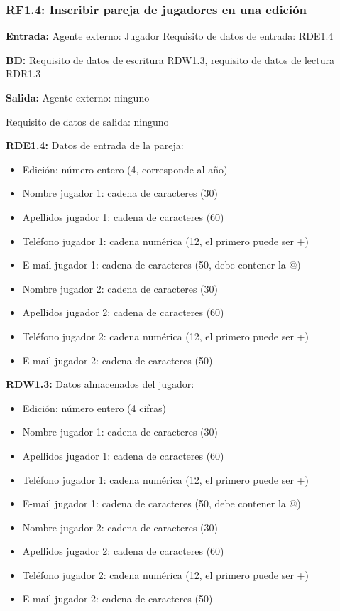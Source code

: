 \subsubsection{RF1.4: Inscribir pareja de jugadores en una edición}

\textbf{Entrada:} Agente externo: Jugador        Requisito de datos de entrada: RDE1.4

\textbf{BD:} Requisito de datos de escritura RDW1.3, requisito de datos de lectura RDR1.3

\textbf{Salida:} Agente externo: ninguno

Requisito de datos de salida: ninguno

\textbf{RDE1.4:} Datos de entrada de la pareja:
\begin{itemize}
	\item Edición: número entero (4, corresponde al año)
\newline
	\item Nombre jugador 1: cadena de caracteres (30)
	\item Apellidos jugador 1: cadena de caracteres (60)
	\item Teléfono jugador 1: cadena numérica (12, el primero puede ser +)
	\item E-mail jugador 1: cadena de caracteres (50, debe contener la @)
\newline
	\item Nombre jugador 2: cadena de caracteres (30)
	\item Apellidos jugador 2: cadena de caracteres (60)
	\item Teléfono jugador 2: cadena numérica (12, el primero puede ser  +)
	\item E-mail jugador 2: cadena de caracteres (50)
\end{itemize}

\textbf{RDW1.3:} Datos almacenados del jugador:
\begin{itemize}
	\item Edición: número entero (4 cifras)
\newline
	\item Nombre jugador 1: cadena de caracteres (30)
	\item Apellidos jugador 1: cadena de caracteres (60)
	\item Teléfono jugador 1: cadena numérica (12, el primero puede ser +)
	\item E-mail jugador 1: cadena de caracteres (50, debe contener la @)
\newline
	\item Nombre jugador 2: cadena de caracteres (30)
	\item Apellidos jugador 2: cadena de caracteres (60)
	\item Teléfono jugador 2: cadena numérica (12, el primero puede ser  +)
	\item E-mail jugador 2: cadena de caracteres (50)
\end{itemize}

